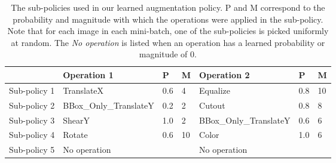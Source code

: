 \documentclass[10pt,twocolumn,letterpaper]{article}
\begin{document}
\begin{table*}[tbh]
\centering
\small
\begin{tabular}{lllllll}

&Operation 1 &P & M &Operation 2 &P&M\\ 
  \hline
Sub-policy 1&TranslateX&0.6&4&Equalize&0.8&10\\
Sub-policy 2&BBox\_Only\_TranslateY&0.2&2&Cutout&0.8&8\\
Sub-policy 3&ShearY&1.0&2&BBox\_Only\_TranslateY&0.6&6\\
Sub-policy 4&Rotate&0.6&10&Color&1.0&6\\
Sub-policy 5&No operation&&&No operation&&\\
\hline
\end{tabular}
\caption{The sub-policies used in our learned augmentation policy. P and M correspond to the probability and magnitude with which the operations were applied in the sub-policy. Note that for each image in each mini-batch, one of the sub-policies is picked uniformly at random. The {\it No operation} is listed when an operation has a learned probability or magnitude of 0.}
\label{tab:policy}
\end{table*}



%
 
\end{document}
